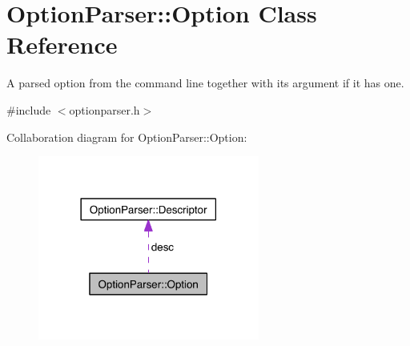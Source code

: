 \hypertarget{class_option_parser_1_1_option}{\section{Option\-Parser\-:\-:Option Class Reference}
\label{class_option_parser_1_1_option}
}


A parsed option from the command line together with its argument if it has one.  




{\ttfamily \#include $<$optionparser.\-h$>$}



Collaboration diagram for Option\-Parser\-:\-:Option\-:\nopagebreak
\begin{figure}[H]
\begin{center}
\leavevmode
\includegraphics[width=206pt]{class_option_parser_1_1_option__coll__graph}
\end{center}
\end{figure}
